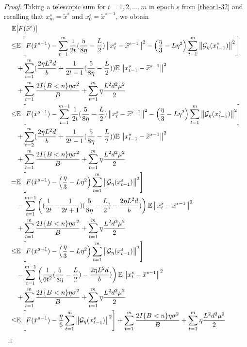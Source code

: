 \documentclass{article}
\newcommand*{\G}{\mathcal{G}}
\newcommand*{\E}{\mathbb{E}}
\newcommand{\norm}[1]{\left\lVert#1\right\rVert}
\theoremstyle{definition}
\theoremstyle{remark}
\begin{document}
\begin{proof}
Taking a telescopic sum for $t = 1, 2, \ldots, m$ in epoch $s$ from \eqref{theor1-32} and recalling that $x_m^s = \tilde{x}^s$ and $x_0^s = \tilde{x}^{s-1}$, we obtain
 \begin{align} 
\E&[F(\tilde{x}^s)] \notag
\\ \leq& \E\left[F(\tilde{x}^{s-1})  -\sum_{t=1}^m\frac{1}{2t}(\frac{5}{8\eta} - \frac{L}{2})\norm{{x}_t^s-\widetilde{x}^{s-1}}^2- \left(\frac{\eta}{3}-L\eta^2\right)\sum_{t=1}^m\norm{\G_{\eta}(x_{t-1}^s)}^2\right]\notag\\
&+\sum_{t=1}^m(\frac{2\eta L^2 d}{b}+\frac{1}{2t-1}(\frac{5}{8\eta} - \frac{L}{2}))\E\norm{x_{t-1}^s-\widetilde{x}^{s-1}}^2\notag\\
&+ \sum_{t=1}^m \frac{2I\{B < n\}\eta \sigma ^2}{B}+\sum_{t=1}^m \eta \frac{L^2 d^2 \mu^2}{2}\notag\\
\leq& \E\left[F(\tilde{x}^{s-1})  -\sum_{t=1}^{m-1}\frac{1}{2t}(\frac{5}{8\eta} - \frac{L}{2})\norm{{x}_t^s-\widetilde{x}^{s-1}}^2- \left(\frac{\eta}{3}-L\eta^2\right)\sum_{t=1}^m\norm{\G_{\eta}(x_{t-1}^s)}^2\right]\notag\\
&+\sum_{t=2}^m(\frac{2\eta L^2 d}{b}+\frac{1}{2t-1}(\frac{5}{8\eta} - \frac{L}{2}))\E\norm{x_{t-1}^s-\widetilde{x}^{s-1}}^2\notag\\
&+ \sum_{t=1}^m \frac{2I\{B < n\}\eta \sigma ^2}{B}+\sum_{t=1}^m \eta \frac{L^2 d^2 \mu^2}{2}\label{theor1-34}
\\
=& \E\left[F(\tilde{x}^{s-1}) - \left(\frac{\eta}{3}-L\eta^2\right)\sum_{t=1}^m\norm{\G_{\eta}(x_{t-1}^s)}^2\right]\notag\\
&-\sum_{t=1}^{m-1}\left((\frac{1}{2t} - \frac{1}{2t+1})(\frac{5}{8\eta} - \frac{L}{2})-\frac{2\eta L^2 d}{b})\right)\E\norm{x_{t}^s-\widetilde{x}^{s-1}}^2\notag\\
&+ \sum_{t=1}^m \frac{2I\{B < n\}\eta \sigma ^2}{B}+\sum_{t=1}^m \eta \frac{L^2 d^2 \mu^2}{2}\notag\\
\leq& \E\left[F(\tilde{x}^{s-1}) - \left(\frac{\eta}{3}-L\eta^2\right)\sum_{t=1}^m\norm{\G_{\eta}(x_{t-1}^s)}^2\right]\notag\\
&-\sum_{t=1}^{m-1}\left(\frac{1}{6t^2}(\frac{5}{8\eta} - \frac{L}{2})-\frac{2\eta L^2 d}{b})\right)\E\norm{x_{t}^s-\widetilde{x}^{s-1}}^2\notag\\
&+ \sum_{t=1}^m \frac{2I\{B < n\}\eta \sigma ^2}{B}+\sum_{t=1}^m \eta \frac{L^2 d^2 \mu^2}{2}\notag\\
\leq& \E\left[F(\tilde{x}^{s-1}) - \frac{\eta}{6}\sum_{t=1}^m\norm{\G_{\eta}(x_{t-1}^s)}^2\right]+ \sum_{t=1}^m \frac{2I\{B < n\}\eta \sigma ^2}{B}+\sum_{t=1}^m \eta \frac{L^2 d^2 \mu^2}{2}\label{theor1-35}

\end{align}
\end{proof}
\end{document}
